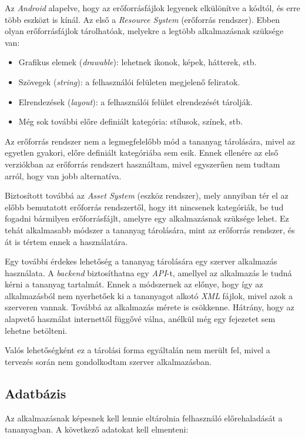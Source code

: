 \documentclass[12pt,a4paper]{article}
\newcommand{\xml}{\textit{XML}\xspace}
\begin{document}
	Az \textit{Android} alapelve, hogy az erőforrásfájlok legyenek elkülönítve a kódtól, és erre több eszközt is kínál. Az első a \textit{Resource System} (erőforrás rendszer). Ebben olyan erőforrásfájlok tárolhatóak, melyekre a legtöbb alkalmazásnak szüksége van:
	
	\begin{itemize}
		\item Grafikus elemek (\textit{drawable}): lehetnek ikonok, képek, hátterek, stb.
		\item Szövegek (\textit{string}): a felhasználói felületen megjelenő feliratok.
		\item Elrendezések (\textit{layout}): a felhasználói felület elrendezését tárolják.
		\item Még sok további előre definiált kategória: stílusok, színek, stb.
	\end{itemize} 

	Az erőforrás rendszer nem a legmegfelelőbb mód a tananyag tárolására, mivel az egyetlen gyakori, előre definiált kategóriába sem esik. Ennek ellenére az első verziókban az erőforrás rendszert használtam, mivel egyszerűen nem tudtam arról, hogy van jobb alternatíva.
	
	Biztosított továbbá az \textit{Asset System} (eszköz rendszer), mely annyiban tér el az előbb bemutatott erőforrás rendszertől, hogy itt nincsenek kategóriák, be tud fogadni bármilyen erőforrásfájlt, amelyre egy alkalmazásnak szüksége lehet. Ez tehát alkalmasabb módszer a tananyag tárolására, mint az erőforrás rendszer, és át is tértem ennek a használatára.
	
	Egy további érdekes lehetőség a tananyag tárolására egy szerver alkalmazás használata. A \textit{backend} biztosíthatna egy \textit{API}-t, amellyel az alkalmazás le tudná kérni a tananyag tartalmát. Ennek a módszernek az előnye, hogy így az alkalmazásból nem nyerhetőek ki a tananyagot alkotó \xml fájlok, mivel azok a szerveren vannak. Továbbá az alkalmazás mérete is csökkenne. Hátrány, hogy az alapvető használat internettől függővé válna, anélkül még egy fejezetet sem lehetne betölteni. 
	
	Valós lehetőségként ez a tárolási forma egyáltalán nem merült fel, mivel a tervezés során nem gondolkodtam szerver alkalmazásban.
	
	\subsection{Adatbázis}
	
	Az alkalmazásnak képesnek kell lennie eltárolnia felhasználó előrehaladását a tananyagban. A következő adatokat kell elmenteni:
	
\end{document}
